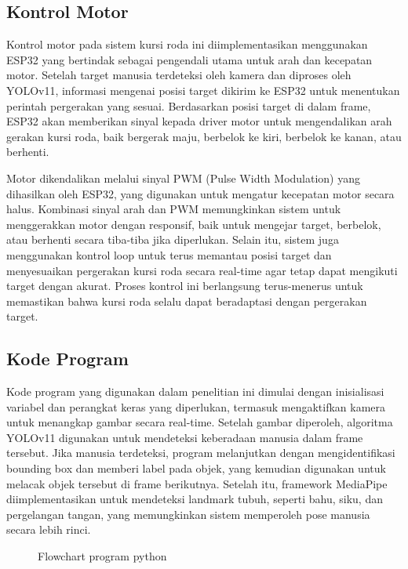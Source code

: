 \subsection{Kontrol Motor}
\label{subsec:kontrol_motor}

Kontrol motor pada sistem kursi roda ini diimplementasikan menggunakan ESP32 yang bertindak sebagai pengendali utama untuk arah dan kecepatan motor. Setelah target manusia terdeteksi oleh kamera dan diproses oleh YOLOv11, informasi mengenai posisi target dikirim ke ESP32 untuk menentukan perintah pergerakan yang sesuai. Berdasarkan posisi target di dalam frame, ESP32 akan memberikan sinyal kepada driver motor untuk mengendalikan arah gerakan kursi roda, baik bergerak maju, berbelok ke kiri, berbelok ke kanan, atau berhenti.

Motor dikendalikan melalui sinyal PWM (Pulse Width Modulation) yang dihasilkan oleh ESP32, yang digunakan untuk mengatur kecepatan motor secara halus. Kombinasi sinyal arah dan PWM memungkinkan sistem untuk menggerakkan motor dengan responsif, baik untuk mengejar target, berbelok, atau berhenti secara tiba-tiba jika diperlukan. Selain itu, sistem juga menggunakan kontrol loop untuk terus memantau posisi target dan menyesuaikan pergerakan kursi roda secara real-time agar tetap dapat mengikuti target dengan akurat. Proses kontrol ini berlangsung terus-menerus untuk memastikan bahwa kursi roda selalu dapat beradaptasi dengan pergerakan target.

\subsection{Kode Program}
\label{subsec:kode_program}

Kode program yang digunakan dalam penelitian ini dimulai dengan inisialisasi variabel dan perangkat keras yang diperlukan, termasuk mengaktifkan kamera untuk menangkap gambar secara real-time. Setelah gambar diperoleh, algoritma YOLOv11 digunakan untuk mendeteksi keberadaan manusia dalam frame tersebut. Jika manusia terdeteksi, program melanjutkan dengan mengidentifikasi bounding box dan memberi label pada objek, yang kemudian digunakan untuk melacak objek tersebut di frame berikutnya. Setelah itu, framework MediaPipe diimplementasikan untuk mendeteksi landmark tubuh, seperti bahu, siku, dan pergelangan tangan, yang memungkinkan sistem memperoleh pose manusia secara lebih rinci.

\begin{figure}[H]
  \centering
  \resizebox{0.8\linewidth}{!}{
    
  }
  \caption{Flowchart program python}
\end{figure}


